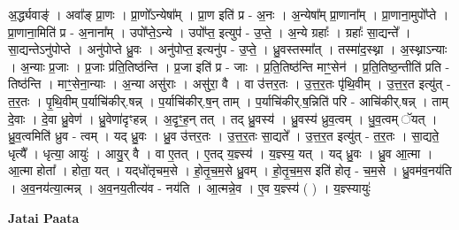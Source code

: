 \documentclass[17pt]{extarticle}
\begin{document}
अ॒र्द्ध्यवाङ्॑ । अवा᳚ङ्‍ प्रा॒णः । प्रा॒णो᳚ऽन्येषा᳚म् । प्रा॒ण इति॑ प्र - अ॒नः । अ॒न्येषा᳚म् प्रा॒णाना᳚म् । प्रा॒णाना॒मुपो᳚प्ते । प्रा॒णाना॒मिति॑ प्र - अ॒नाना᳚म् । उपो᳚प्ते॒ऽन्ये । उपो᳚प्त॒ इत्युप॑ - उ॒प्ते॒ । अ॒न्ये ग्रहाः᳚ । ग्रहाः᳚ सा॒द्यन्ते᳚ । सा॒द्यन्तेऽनु॑पोप्ते । अनु॑पोप्ते ध्रु॒वः । अनु॑पोप्त॒ इत्यनु॑प - उ॒प्ते॒ । ध्रु॒वस्तस्मा᳚त् । तस्मा॑द॒स्थ्ना । अ॒स्थ्नाऽन्याः । अ॒न्याः प्र॒जाः । प्र॒जाः प्र॑ति॒तिष्ठ॑न्ति । प्र॒जा इति॑ प्र - जाः । प्र॒ति॒तिष्ठ॑न्ति माꣳ॒॒सेन॑ । प्र॒ति॒तिष्ठ॒न्तीति॑ प्रति - तिष्ठ॑न्ति । माꣳ॒॒सेना॒न्याः । अ॒न्या असु॑राः । असु॑रा॒ वै । वा उ॑त्तर॒तः । उ॒त्त॒र॒तः पृ॑थि॒वीम् । उ॒त्त॒र॒त इत्यु॑त् - त॒र॒तः । पृ॒थि॒वीम् प॒र्याचि॑कीर्.षन्न् । प॒र्याचि॑कीर्.ष॒न् ताम् । प॒र्याचि॑कीर्.ष॒न्निति॑ परि - आचि॑कीर्.षन्न् । ताम् दे॒वाः । दे॒वा ध्रु॒वेण॑ । ध्रु॒वेणा॑दृꣳहन्न् । अ॒दृꣳ॒॒ह॒न् तत् । तद् ध्रु॒वस्य॑ । ध्रु॒वस्य॑ ध्रुव॒त्वम् । धु॒व॒त्वम् ॅयत् । ध्रु॒व॒त्वमिति॑ ध्रुव - त्वम् । यद् ध्रु॒वः । ध्रु॒व उ॑त्तर॒तः । उ॒त्त॒र॒तः सा॒द्यते᳚ । उ॒त्त॒र॒त इत्यु॑त् - त॒र॒तः । सा॒द्यते॒ धृत्यै᳚ । धृत्या॒ आयुः॑ । आयु॒र् वै । वा ए॒तत् । ए॒तद् य॒ज्ञ्स्य॑ । य॒ज्ञ्स्य॒ यत् । यद् ध्रु॒वः । ध्रु॒व आ॒त्मा । आ॒त्मा होता᳚ । होता॒ यत् । यद्‍धो॑तृचम॒से । हो॒तृ॒च॒म॒से ध्रु॒वम् । हो॒तृ॒च॒म॒स इति॑ होतृ - च॒म॒से । ध्रु॒वम॑व॒नय॑ति । अ॒व॒नय॑त्या॒त्मन्न् । अ॒व॒नय॒तीत्य॑व - नय॑ति । आ॒त्मन्ने॒व । ए॒व य॒ज्ञ्स्य॑ ( ) । य॒ज्ञ्स्यायुः॑ \newline

\textbf{Jatai Paata} \newline
\end{document}
